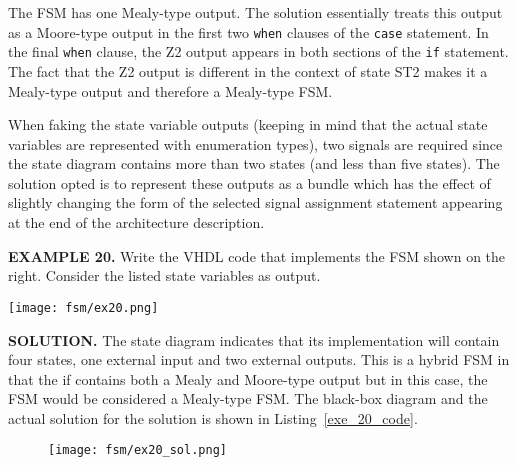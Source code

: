 \begin{my_list}
\item The FSM has one Mealy-type output. The solution essentially treats this output as a Moore-type output in the first two \texttt{when} clauses of the \texttt{case} statement. In the final \texttt{when} clause, the Z2 output appears in both sections of the \texttt{if} statement. The fact that the Z2 output is different in the context of state ST2 makes it a Mealy-type output and therefore a Mealy-type FSM. 

\item When faking the state variable outputs (keeping in mind that the actual state variables are represented with enumeration types), two signals are required since the state diagram contains more than two states (and less than five states). The solution opted is to represent these outputs as a bundle which has the effect of slightly changing the form of the selected signal assignment statement appearing at the end of the architecture description. 
\end{my_list}

\begin{leftbar}
\begin{minipage}[t]{0.5\textwidth}
\vspace{10pt}
\noindent
\textbf{EXAMPLE 20.}
Write the VHDL code that implements the FSM shown on the right. Consider the listed state variables as output.
\end{minipage}
\begin{minipage}[t]{0.47\textwidth}
\vspace{0pt}\raggedright
\centering
\texttt{[image: fsm/ex20.png]}
\end{minipage}
\end{leftbar}

\noindent
\textbf{SOLUTION.} The state diagram indicates that its implementation will contain four states, one external input and two external outputs. This is a hybrid FSM in that the if contains both a Mealy and Moore-type output but in this case, the FSM would be considered a Mealy-type FSM. The black-box diagram and the actual solution for the solution is shown in Listing~\ref{exe_20_code}. 
\begin{figure}[!h]
    \centering
	\texttt{[image: fsm/ex20\_sol.png]}
\end{figure}

